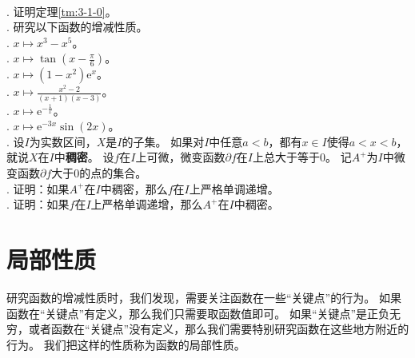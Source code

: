 \documentclass[12pt,UTF8]{ctexbook}
\begin{document}
\begin{xt}
    \mbox{} \\
    . 证明定理\ref{tm:3-1-0}。\\
    . 研究以下函数的增减性质。\\
    . $x\mapsto x^3 - x^5$。\\
    . $x\mapsto \tan{\left(x - \frac{\pi}{6}\right)}$。\\
    . $x\mapsto (1 - x^2) \mathrm{e}^x$。\\
    . $x\mapsto \frac{x^2 - 2}{(x + 1)(x - 3)}$。\\
    . $x\mapsto \mathrm{e}^{-\frac{1}{x}}$。\\
    . $x\mapsto \mathrm{e}^{-3x} \sin{(2x)}$。\\
    . 设$I$为实数区间，$X$是$I$的子集。
    如果对$I$中任意$a < b$，都有$x\in I$使得$a<x<b$，就说$X$在$I$中\textbf{稠密}。
    设$f$在$I$上可微，微变函数$\partial f$在$I$上总大于等于$0$。
    记$A^+$为$I$中微变函数$\partial f$大于$0$的点的集合。\\
    . 证明：如果$A^+$在$I$中稠密，那么$f$在$I$上严格单调递增。\\
    . 证明：如果$f$在$I$上严格单调递增，那么$A^+$在$I$中稠密。
    
\end{xt}


 \section{局部性质}

研究函数的增减性质时，我们发现，需要关注函数在一些“关键点”的行为。
如果函数在“关键点”有定义，那么我们只需要取函数值即可。
如果“关键点”是正负无穷，或者函数在“关键点”没有定义，那么我们需要特别研究函数在这些地方附近的行为。
我们把这样的性质称为函数的局部性质。
\end{document}
